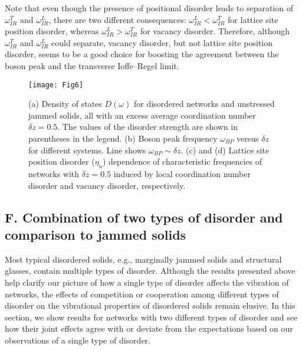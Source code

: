 \documentclass[twocolumn,printnumbers,amsmath,amssymb,prl,verbatim]{revtex4}
\begin{document}
Note that even though the presence of positional disorder leads to separation of $\omega_{IR}^T$ and $\omega_{IR}^L$, there are two different consequences: $\omega_{IR}^L<\omega_{IR}^T$ for lattice site position disorder, whereas $\omega_{IR}^L>\omega_{IR}^T$ for vacancy disorder. Therefore, although $\omega_{IR}^T$ and $\omega_{IR}^L$ could separate, vacancy disorder, but not lattice site position disorder, seems to be a good choice for boosting the agreement between the boson peak and the transverse Ioffe--Regel limit.



\begin{figure}
	\texttt{[image: Fig6]}
\caption{\label{fig:fig6} (a) Density of states $D(\omega)$ for disordered networks and unstressed jammed solids, all with an excess average coordination number $\delta z=0.5$. The values of the disorder strength are shown in parentheses in the legend. (b) Boson peak frequency $\omega_{BP}$ versus $\delta z$ for different systems. Line shows $\omega_{BP}\sim \delta z$. (c) and (d) Lattice site position disorder ($\eta_u$) dependence of characteristic frequencies of networks with $\delta z=0.5$ induced by local coordination number disorder and vacancy disorder, respectively.
}
\end{figure}

\subsection{F. Combination of two types of disorder and comparison to jammed solids}

Most typical disordered solids, e.g., marginally jammed solids and structural glasses, contain multiple types of disorder. Although the results presented above help clarify our picture of how a single type of disorder affects the vibration of networks, the effects of competition or cooperation among different types of disorder on the vibrational properties of disordered solids remain elusive. In this section, we show results for networks with two different types of disorder and see how their joint effects agree with or deviate from the expectations based on our observations of a single type of disorder.
\end{document}
